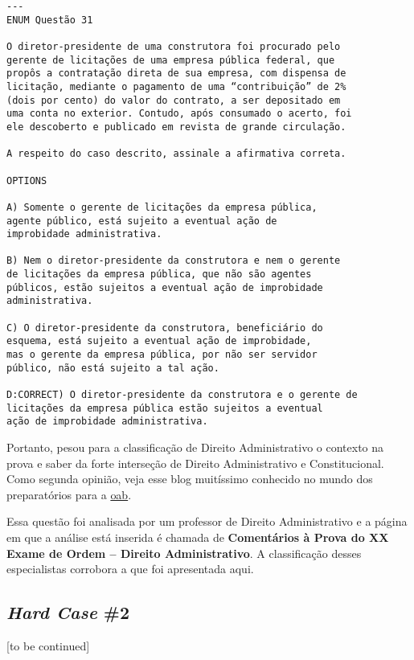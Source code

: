 \documentclass{article}
\begin{document}
\begin{verbatim}
---
ENUM Questão 31 
 
O diretor-presidente de uma construtora foi procurado pelo 
gerente de licitações de uma empresa pública federal, que 
propôs a contratação direta de sua empresa, com dispensa de 
licitação, mediante o pagamento de uma “contribuição” de 2% 
(dois por cento) do valor do contrato, a ser depositado em 
uma conta no exterior. Contudo, após consumado o acerto, foi 
ele descoberto e publicado em revista de grande circulação. 
 
A respeito do caso descrito, assinale a afirmativa correta. 

OPTIONS

A) Somente o gerente de licitações da empresa pública, 
agente público, está sujeito a eventual ação de 
improbidade administrativa. 

B) Nem o diretor-presidente da construtora e nem o gerente 
de licitações da empresa pública, que não são agentes 
públicos, estão sujeitos a eventual ação de improbidade 
administrativa. 

C) O diretor-presidente da construtora, beneficiário do 
esquema, está sujeito a eventual ação de improbidade, 
mas o gerente da empresa pública, por não ser servidor 
público, não está sujeito a tal ação. 

D:CORRECT) O diretor-presidente da construtora e o gerente de 
licitações da empresa pública estão sujeitos a eventual 
ação de improbidade administrativa. 
\end{verbatim}

Portanto, pesou para a classificação de Direito Administrativo o contexto na prova e saber da forte interseção de Direito Administrativo e Constitucional. Como segunda opinião, veja esse blog muitíssimo conhecido no mundo dos preparatórios para a \href{https://www.estrategiaconcursos.com.br/blog/comentarios-administrativo-oab/}{oab}.

Essa questão foi analisada por um professor de Direito Administrativo e a página em que a análise está inserida é chamada de \textbf{Comentários à Prova do XX Exame de Ordem – Direito Administrativo}. A classificação desses especialistas corrobora a que foi apresentada aqui.

\subsection*{\textit{Hard Case} \#2}

[to be continued]
\end{document}
